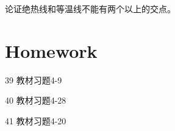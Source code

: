 \documentclass[CJK]{beamer}
\begin{document}
\begin{frame}
\bch


\bitem
\item{论证绝热线和等温线不能有两个以上的交点。}
\eitem
\ech
\end{frame}




\section{Homework}

\begin{frame}
  \bch
  {\small 
  \bitem
\item[39]{教材习题4-9}
\item[40]{教材习题4-28}
\item[41]{教材习题4-20}
  \eitem
  }
  \ech
\end{frame}
\end{document}
